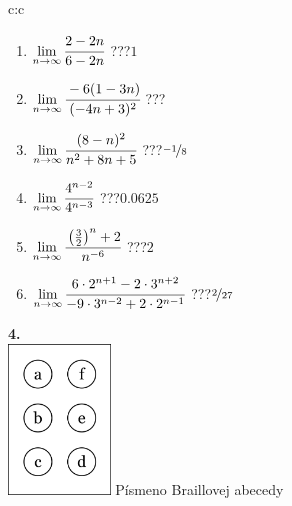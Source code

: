 \documentclass[10pt]{report}
\begin{document}
\begin{tabular}{c:c}
\begin{minipage}[c][104.5mm][t]{0.5\linewidth}
\begin{center}
\begin{minipage}{0.79\linewidth}
\begin{center}
\begin{varwidth}{\linewidth}
\begin{enumerate}
\normalsize
\item $\lim\limits_{n\to\infty}\cfrac{2-2n}{6-2n}$\quad \dotfill\; ???\;\dotfill \quad $1$
\item $\lim\limits_{n\to\infty}\cfrac{-6(1-3n)}{(-4n+3)^2}$\quad \dotfill\; ???\;\dotfill {}
\item $\lim\limits_{n\to\infty}\cfrac{(8-n)^2}{n^2+8n+5}$\quad \dotfill\; ???\;\dotfill \quad $\nicefrac{-1}{8}$
\item $\lim\limits_{n\to\infty}\cfrac{4^{n-2}}{4^{n-3}}$\quad \dotfill\; ???\;\dotfill \quad $0.0625$
\item $\lim\limits_{n\to\infty}\cfrac{\left(\frac{3}{2}\right)^n +2}{n^{-6}}$\quad \dotfill\; ???\;\dotfill \quad $2$
\item $\lim\limits_{n\to\infty}\cfrac{6\cdot 2^{n+1}-2\cdot 3^{n+2}}{-9\cdot 3^{n-2}+2\cdot 2^{n-1}}$\quad \dotfill\; ???\;\dotfill \quad $\nicefrac{2}{27}$
\end{enumerate}
\end{varwidth}
\end{center}
\end{minipage}
\begin{minipage}{0.20\linewidth}
\begin{center}
{\Huge\bfseries 4.} \\[2mm]
\includegraphics[height=40mm]{../images/braille.png}
{\small Písmeno Braillovej abecedy}
\end{center}
\end{minipage}
\end{center}
\end{minipage}
%
\end{tabular}
\newpage
\thispagestyle{empty}
\end{document}
